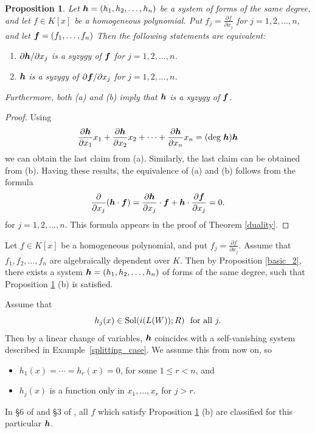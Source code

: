 \documentclass[12pt]{article}
\newtheorem{proposition}[theorem]{Proposition}
\theoremstyle{definition}
\theoremstyle{remark}
\def\deg{{\rm deg}}
\def\sol{{\rm Sol}}
\def\boldh{\mbox{\boldmath $h$}}
\def\boldf{\mbox{\boldmath $f$}}
\def\pa{\partial}
\begin{document}
\begin{proposition} \label{ab}
Let $\boldh = (h_1,h_2,\ldots,h_n)$ be a system of forms of the same degree, 
and let $f \in K[x]$ be a homogeneous polynomial. Put $f_j=\frac{\pa f}{\pa x_j}$
for $j =1,2,\ldots,n$, and let $\boldf=(f_1, \dots, f_n)$
Then the following statements are equivalent:
\begin{enumerate}
\item[{\rm (a)}] 
$\pa \boldh/\pa x_j$ is a syzygy of $\boldf$ for $j=1,2, \ldots, n$.  
\item[{\rm (b)}]
$\boldh$ is a syzygy of $\pa \boldf/\pa x_j$ for $j=1,2, \ldots, n$.
\end{enumerate}
Furthermore, both {\rm (a)} and {\rm (b)} imply that $\boldh$ is a syzygy of 
$\boldf$.
\end{proposition}

\begin{proof}
Using
$$
\frac{\pa \boldh}{\pa x_1} x_1 + \frac{\pa \boldh}{\pa x_2} x_2 + 
\cdots + \frac{\pa \boldh}{\pa x_n} x_n = (\deg\; \boldh) \boldh
$$
we can obtain the last claim from (a). Similarly, the last claim can
be obtained from (b). Having these results, the equivalence of (a) and (b)
follows from the formula 
\[  \frac{\pa}{\pa x_j}(\boldh\cdot \boldf)= \frac{\pa \boldh}{\pa x_j} \cdot \boldf + \boldh \cdot \frac{\pa \boldf}{\pa x_j}=0.\]
for $j = 1, 2, \ldots, n$. This formula appears in the proof of Theorem \ref{duality}.
\end{proof}

Let $f \in K[x]$ be a homogeneous polynomial, and put $f_j = \frac{\pa f}{\pa x_j}$.
Assume that $f_1, f_2, \ldots, f_n$ are algebraically dependent over $K$. Then
by Proposition \ref{basic_2}, 
there exists a system $\boldh = (h_1,h_2,\ldots,h_n)$ of forms of the same degree,
such that Proposition \ref{ab} (b) is satisfied. 

Assume that 
\begin{equation}  \label{splitting_case_2}
h_j(x) \in \sol(i(L(W));R) \ \mbox{ for all } j. 
\end{equation}
Then by a linear change of variables, $\boldh$ coincides with a self-vanishing system described in 
Example~\ref{splitting_case}.
We assume this from now on, so
\begin{itemize}

\item $h_1(x) = \cdots = h_r(x) = 0$, for some $ 1  \leq r < n$, and 

\item $h_j(x)$ is a function only in $x_1, \ldots, x_r$ for $ j > r$.

\end{itemize}
In \S 6 of \cite{GNzzz} and \S 3 of \cite{clossen}, all $f$ which satisfy 
Proposition \ref{ab} (b) are classified for this particular $\boldh$.
\end{document}
